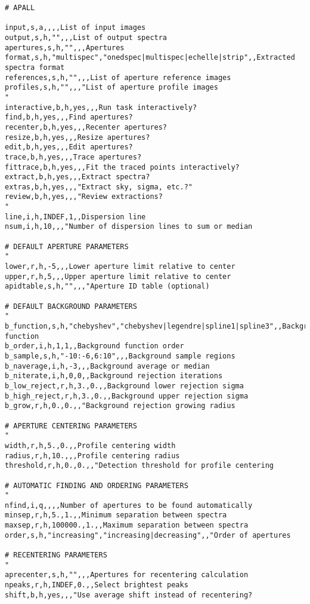 \begingroup \fontsize{10pt}{10pt}
\selectfont
\begin{verbatim} 
# APALL

input,s,a,,,,List of input images
output,s,h,"",,,List of output spectra
apertures,s,h,"",,,Apertures
format,s,h,"multispec","onedspec|multispec|echelle|strip",,Extracted spectra format
references,s,h,"",,,List of aperture reference images
profiles,s,h,"",,,"List of aperture profile images
"
interactive,b,h,yes,,,Run task interactively?
find,b,h,yes,,,Find apertures?
recenter,b,h,yes,,,Recenter apertures?
resize,b,h,yes,,,Resize apertures?
edit,b,h,yes,,,Edit apertures?
trace,b,h,yes,,,Trace apertures?
fittrace,b,h,yes,,,Fit the traced points interactively?
extract,b,h,yes,,,Extract spectra?
extras,b,h,yes,,,"Extract sky, sigma, etc.?"
review,b,h,yes,,,"Review extractions?
"
line,i,h,INDEF,1,,Dispersion line
nsum,i,h,10,,,"Number of dispersion lines to sum or median

# DEFAULT APERTURE PARAMETERS
"
lower,r,h,-5,,,Lower aperture limit relative to center
upper,r,h,5,,,Upper aperture limit relative to center
apidtable,s,h,"",,,"Aperture ID table (optional)

# DEFAULT BACKGROUND PARAMETERS
"
b_function,s,h,"chebyshev","chebyshev|legendre|spline1|spline3",,Background function
b_order,i,h,1,1,,Background function order
b_sample,s,h,"-10:-6,6:10",,,Background sample regions
b_naverage,i,h,-3,,,Background average or median
b_niterate,i,h,0,0,,Background rejection iterations
b_low_reject,r,h,3.,0.,,Background lower rejection sigma
b_high_reject,r,h,3.,0.,,Background upper rejection sigma
b_grow,r,h,0.,0.,,"Background rejection growing radius

# APERTURE CENTERING PARAMETERS
"
width,r,h,5.,0.,,Profile centering width
radius,r,h,10.,,,Profile centering radius
threshold,r,h,0.,0.,,"Detection threshold for profile centering

# AUTOMATIC FINDING AND ORDERING PARAMETERS
"
nfind,i,q,,,,Number of apertures to be found automatically
minsep,r,h,5.,1.,,Minimum separation between spectra
maxsep,r,h,100000.,1.,,Maximum separation between spectra
order,s,h,"increasing","increasing|decreasing",,"Order of apertures

# RECENTERING PARAMETERS
"
aprecenter,s,h,"",,,Apertures for recentering calculation
npeaks,r,h,INDEF,0.,,Select brightest peaks
shift,b,h,yes,,,"Use average shift instead of recentering?


\end{verbatim}
